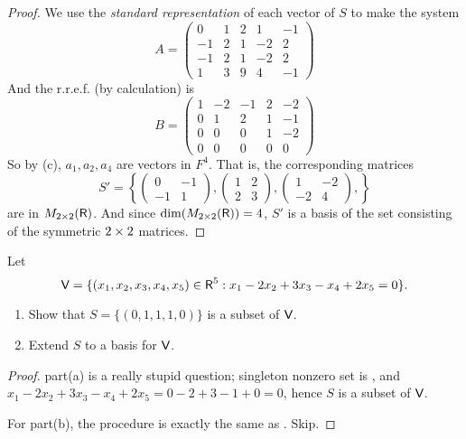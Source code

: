 \begin{proof}
We use the \emph{standard representation} of each vector of \(S\) to make the system
\[
    A = \left(\begin{array}{ccccc}
        0 & 1 & 2 & 1 & -1 \\
        -1 & 2 & 1 & -2 & 2 \\
        -1 & 2 & 1 & -2 & 2 \\
        1 & 3 & 9 & 4 & -1
    \end{array}\right)
\]
And the r.r.e.f. (by calculation) is
\[
    B = \left(\begin{array}{ccccc}
        1 & -2 & -1 & 2 & -2 \\
        0 & 1 & 2 & 1 & -1 \\
        0 & 0 & 0 & 1 & -2 \\
        0 & 0 & 0 & 0 & 0
    \end{array}\right)
\]
So by (c), \(a_1, a_2, a_4\) are \emph{\LID{}} vectors in \(F^4\).
That is, the corresponding matrices
\[
    S' = \left\{
        \left(\begin{array}{rr}
            0 & -1 \\
            -1 & 1
        \end{array}\right),
        \left(\begin{array}{ll}
            1 & 2 \\
            2 & 3
        \end{array}\right),
        \left(\begin{array}{rr}
            1 & -2 \\
            -2 & 4
        \end{array}\right),
    \right\}
\]
are \LID{} in \(M_{2 \times 2}(\textsf{R})\).
And since \(\dim(M_{2 \times 2}(\textsf{R})) = 4\), \(S'\) is a basis of the set consisting of the symmetric \(2 \times 2\) matrices.
\end{proof}

\begin{exercise} \label{exercise 3.4.10}
Let
\[
    \textsf{V} = \{(x_1, x_2, x_3, x_4, x_5) \in \textsf{R}^5 : x_1 - 2x_2 + 3x_3 - x_4 + 2x_5 = 0
 \}.
\]
\begin{enumerate}
\item Show that \(S = \{(0, 1, 1, 1, 0)\}\) is a \LID{} subset of \(\textsf{V}\).
\item Extend \(S\) to a basis for \(\textsf{V}\).
\end{enumerate}
\end{exercise}

\begin{proof}
part(a) is a really stupid question; singleton nonzero set is \LID{}, and \(x_1 - 2x_2 + 3x_3 - x_4 + 2x_5 = 0 - 2 + 3 - 1 + 0 = 0\), hence \(S\) is a \LID{} subset of \(\textsf{V}\).

For part(b), the procedure is exactly the same as . Skip.
\end{proof}

